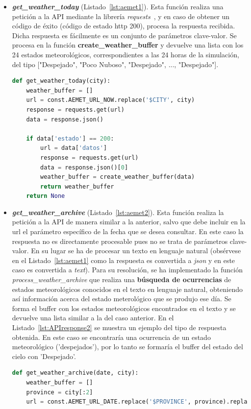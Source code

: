 \begin{itemize}
\item \textit{\textbf{get\_weather\_today}} (Listado~\ref{lst:aemet1}). Esta función realiza una petición a la \gls{API} mediante la librería \textit{requests}~\cite{Kenn11}, y en caso de obtener un código de éxito (código de estado http 200), procesa la respuesta recibida. Dicha respuesta es fácilmente es un conjunto de parámetros clave-valor. Se procesa en la función \textbf{create\_weather\_buffer} y devuelve una lista con los 24 estados meteorológicos, correspondientes a las 24 horas de la simulación, del tipo ["Despejado", "Poco Nuboso", "Despejado", ..., "Despejado"].
\begin{lstlisting}[language=Python,float=ht,caption={Función para obtener los valores meteorológicos del día en curso},label={lst:aemet1}]
def get_weather_today(city):
    weather_buffer = []
    url = const.AEMET_URL_NOW.replace('$CITY', city)
    response = requests.get(url)
    data = response.json()

    if data['estado'] == 200:
        url = data['datos']
        response = requests.get(url)
        data = response.json()[0]
        weather_buffer = create_weather_buffer(data)
        return weather_buffer
    return None
\end{lstlisting}

\item \textit{\textbf{get\_weather\_archive}} (Listado~\ref{lst:aemet2}). Esta función realiza la petición a la \gls{API} de manera similar a la anterior, salvo que debe incluir en la url el parámetro específico de la fecha que se desea consultar. En este caso la respuesta no es directamente procesable pues no se trata de parámetros clave-valor. En su lugar se ha de procesar un texto en lenguaje natural (obsérvese en el Listado~\ref{lst:aemet1} como la respuesta es convertida a \textit{json} y en este caso es convertida a \textit{text}). Para su resolución, se ha implementado la función \textit{process\_weather\_archive} que realiza una \textbf{búsqueda de ocurrencias} de estados meteorológicos conocidos en el texto en lenguaje natural, obteniendo así información acerca del estado meterológico que se produjo ese día. Se forma el buffer con los estados meteorológicos encontrados en el texto y se devuelve una lista similar a la del caso anterior. En el Listado~\ref{lst:APIresponse2} se muestra un ejemplo del tipo de respuesta obtenida. En este caso se encontraría una ocurrencia de un estado meteorológico ('despejados'), por lo tanto se formaría el buffer del estado del cielo con 'Despejado'.
\begin{lstlisting}[language=Python,float=ht,caption={Función para obtener los valores meteorológicos de un día concreto},label={lst:aemet2}]
def get_weather_archive(date, city):
    weather_buffer = []
    province = city[:2]
    url = const.AEMET_URL_DATE.replace('$PROVINCE', province).replace('$DATE', date)


\end{lstlisting}
\end{itemize}
